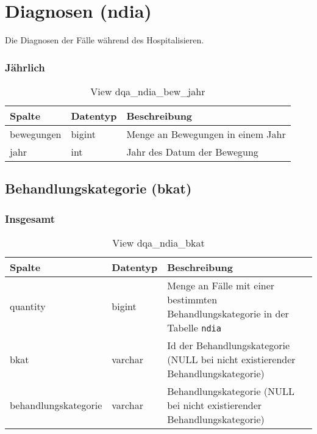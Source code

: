 \section{Diagnosen (ndia)} \label{sec:diag}

Die Diagnosen der Fälle während des Hospitalisieren.

\subsubsection{Jährlich} \label{subsubsec:diagJahr}

\clearpage

\begin{table}[ht]
	\centering   
	\caption{View dqa\_ndia\_bew\_jahr}
	\label{tab:diagJahr}
	\begin{tabular}{||l|l|p{10cm}||}   		
		\hline
		Spalte & Datentyp & Beschreibung \\ [0.5ex]
		\hline\hline
		bewegungen & bigint & Menge an Bewegungen in einem Jahr\\
		\hline
		jahr & int &  Jahr des Datum der Bewegung \\
		\hline
		
	\end{tabular}
\end{table}


\subsection{Behandlungskategorie (bkat)} \label{subsec:behKat}

\subsubsection{Insgesamt} \label{subsubsec:behKatI}

\begin{table}[ht]
	\centering   
	\caption{View dqa\_ndia\_bkat}
	\label{tab:beweBkatAll}
	\begin{tabular}{||l|l|p{10cm}||}   		
		\hline
		Spalte & Datentyp & Beschreibung \\ [0.5ex]
		\hline\hline
		quantity & bigint & Menge an Fälle mit einer bestimmten Behandlungskategorie in der Tabelle \texttt{ndia} \\
		\hline
		bkat & varchar & Id der Behandlungskategorie (NULL bei nicht existierender Behandlungskategorie)\\
		\hline
		behandlungskategorie & varchar & Behandlungskategorie (NULL bei nicht existierender Behandlungskategorie)\\
		\hline
		
	\end{tabular}
\end{table}

